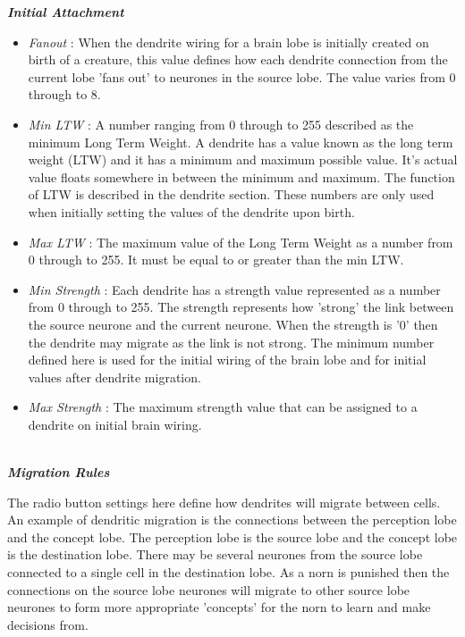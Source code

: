 \documentclass[11pt,twoside,a4paper]{article}
\begin{document}
\textbf{\textit{Initial Attachment}}
\begin{itemize}
	\item[] \emph{Fanout} : When the dendrite wiring for a brain lobe is initially created on birth of a creature, this value defines how each dendrite connection from the current lobe 'fans out' to neurones in the source lobe. The value varies from 0 through to 8.
	\item[] \emph{Min LTW} : A number ranging from 0 through to 255 described as the minimum Long Term Weight. A dendrite has a value known as the long term weight (LTW) and it has a minimum and maximum possible value. It's actual value floats somewhere in between the minimum and maximum. The function of LTW is described in the dendrite section. These numbers are only used when initially setting the values of the dendrite upon birth. %
	\item[] \emph{Max LTW} : The maximum value of the Long Term Weight as a number from 0 through to 255. It must be equal to or greater than the min LTW.
	\item[] \emph{Min Strength} : Each dendrite has a strength value represented as a number from 0 through to 255. The strength represents how 'strong' the link between the source neurone and the current neurone. When the strength is '0' then the dendrite may migrate as the link is not strong. The minimum number defined here is used for the initial wiring of the brain lobe and for initial values after dendrite migration.
	\item[] \emph{Max Strength} : The maximum strength value that can be assigned to a dendrite on initial brain wiring.
\end{itemize}~\\

\textbf{\textit{Migration Rules}}

The radio button settings here define how dendrites will migrate between cells. An example of dendritic migration is the connections between the perception lobe and the concept lobe. The perception lobe is the source lobe and the concept lobe is the destination lobe. There may be several neurones from the source lobe connected to a single cell in the destination lobe. As a norn is punished then the connections on the source lobe neurones will migrate to other source lobe neurones to form more appropriate 'concepts' for the norn to learn and make decisions from.~\\
\end{document}
